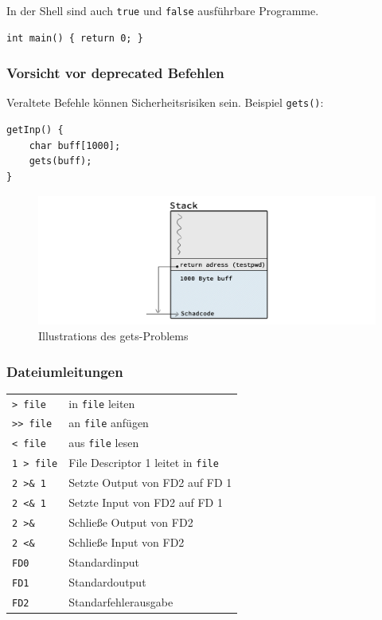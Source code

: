 		In der Shell sind auch \texttt{true} und \texttt{false} ausführbare Programme.
		\begin{lstlisting}
int main() { return 0; }
		\end{lstlisting}


	\subsubsection*{Vorsicht vor deprecated Befehlen} %
	\label{ssub:vorsicht_vor_deprecated_befehlen}
	
		Veraltete Befehle können Sicherheitsrisiken sein. Beispiel \texttt{gets()}:

		\lstCcode[testpwd.c]
		\begin{lstlisting}
getInp() {
	char buff[1000];
	gets(buff);
}
		\end{lstlisting}
		\begin{figure}[hbtp]
			\caption{Illustrations des gets-Problems}
			\includegraphics[width=\textwidth]{workfiles/v3_1}
		\end{figure}


	\subsubsection*{Dateiumleitungen} %
	\label{ssub:dateiumleitungen}
	
		\begin{tabular}{ll}
			\texttt{> file}		&	in \texttt{file} leiten	\\
			\texttt{>> file}	&	an \texttt{file} anfügen	\\
			\texttt{< file}		&	aus \texttt{file} lesen	\\
			\texttt{1 > file}	&	File Descriptor 1 leitet in \texttt{file}	\\
			\texttt{2 >\& 1}	&	Setzte Output von FD2 auf FD 1	\\
			\texttt{2 <\& 1}	&	Setzte Input von FD2 auf FD 1	\\
			\texttt{2 >\&}	&	Schließe Output von FD2\\
			\texttt{2 <\&}	&	Schließe Input von FD2\\
			\texttt{FD0}		&	Standardinput	\\
			\texttt{FD1}		&	Standardoutput	\\
			\texttt{FD2}		&	Standarfehlerausgabe	\\
		\end{tabular}

